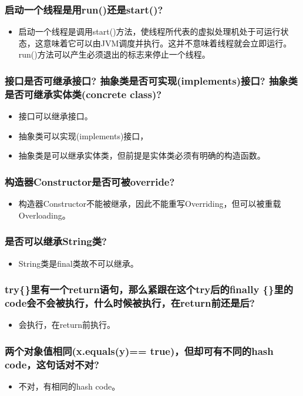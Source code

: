 \documentclass[9pt, b5paper]{article}
\begin{document}
\subsubsection{启动一个线程是用run()还是start()?}
\label{sec-1-1-36}
\begin{itemize}
\item 启动一个线程是调用start()方法，使线程所代表的虚拟处理机处于可运行状态，这意味着它可以由JVM调度并执行。这并不意味着线程就会立即运行。run()方法可以产生必须退出的标志来停止一个线程。
\end{itemize}
\subsubsection{接口是否可继承接口? 抽象类是否可实现(implements)接口? 抽象类是否可继承实体类(concrete class)?}
\label{sec-1-1-37}
\begin{itemize}
\item 接口可以继承接口。
\item 抽象类可以实现(implements)接口，
\item 抽象类是可以继承实体类，但前提是实体类必须有明确的构造函数。
\end{itemize}
\subsubsection{构造器Constructor是否可被override?}
\label{sec-1-1-38}
\begin{itemize}
\item 构造器Constructor不能被继承，因此不能重写Overriding，但可以被重载Overloading。
\end{itemize}
\subsubsection{是否可以继承String类?}
\label{sec-1-1-39}
\begin{itemize}
\item String类是final类故不可以继承。
\end{itemize}
\subsubsection{try\{\}里有一个return语句，那么紧跟在这个try后的finally \{\}里的code会不会被执行，什么时候被执行，在return前还是后?}
\label{sec-1-1-40}
\begin{itemize}
\item 会执行，在return前执行。
\end{itemize}
\subsubsection{两个对象值相同(x.equals(y)== true)，但却可有不同的hash code，这句话对不对?}
\label{sec-1-1-41}
\begin{itemize}
\item 不对，有相同的hash code。
\end{itemize}
\end{document}
